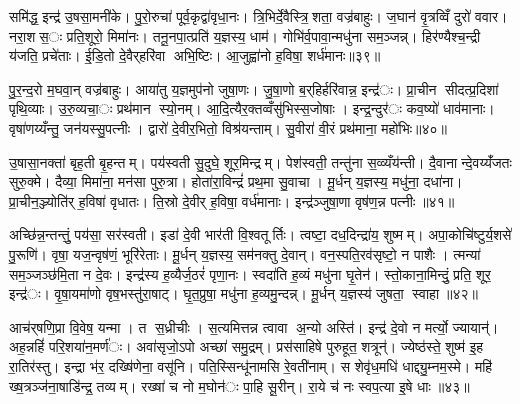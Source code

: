 
समि॑द्ध॒ इन्द्र॑ उ॒षसा॒मनी॑के। पु॒रो॒रुचा॑ पूर्व॒कृद्वा॑वृधा॒नः। त्रि॒भिर्दे॒वैस्त्रि॒शता॒ वज्र॑बाहुः। ज॒घान॑ वृ॒त्रव्विँ दुरो॑ ववार। नरा॒शस॒ः प्रति॒शूरो॒ मिमा॑नः। तनू॒नपा॒त्प्रति॑ य॒ज्ञस्य॒ धाम॑। गोभि॑र्व॒पावा॒न्मधु॑ना सम॒ञ्जन्न्। हिर॑ण्यैश्च॒न्द्री य॑जति॒ प्रचे॑ताः। ई॒डि॒तो दे॒वैर्‌हरि॑वा अभि॒ष्टिः। आ॒जुह्वा॑नो ह॒विषा॒ शर्ध॑मानः॥३९॥

पु॒र॒न्द॒रो म॒घवा॒न् वज्र॑बाहुः। आया॑तु य॒ज्ञमुप॑नो जुषा॒णः। जु॒षा॒णो ब॒र्‌हिर्हरि॑वान्न॒ इन्द्र॑ः। प्रा॒चीन सीदत्प्र॒दिशा॑ पृथि॒व्याः। उ॒रु॒व्यचा॒ः प्रथ॑मान स्यो॒नम्। आ॒दि॒त्यैर॒क्तव्वँसु॑भिस्स॒जोषाः। इन्द्र॒न्दुर॑ः कव॒ष्यो॑ धाव॑मानाः। वृषा॑णय्यँन्तु॒ जन॑यस्सु॒पत्नीः। द्वारो॑ दे॒वीर॒भितो॒ विश्र॑यन्ताम्। सु॒वीरा॑ वी॒रं प्रथ॑माना॒ महो॑भिः॥४०॥

उ॒षासा॒नक्ता॑ बृह॒ती बृ॒हन्तम्। पय॑स्वती सु॒दुघे॒ शूर॒मिन्द्रम्। पेश॑स्वती॒ तन्तु॑ना स॒व्व्यँय॑न्ती। दै॒वानान्दे॒वय्यँ॑जतः सुरु॒क्मे। दैव्या॒ मिमा॑ना॒ मन॑सा पुरु॒त्रा। होता॑रा॒विन्द्रं॑ प्रथ॒मा सु॒वाचा। मू॒र्धन् य॒ज्ञस्य॒ मधु॑ना॒ दधा॑ना। प्रा॒चीन॒ञ्ज्योति॑र् ह॒विषा॑ वृधातः। ति॒स्रो दे॒वीर्‌ ह॒विषा॒ वर्ध॑मानाः। इन्द्र॑ञ्जुषा॒णा वृष॑ण॒न्न पत्नीः॥४१॥

अच्छि॑न्न॒न्तन्तुं॒ पय॑सा॒ सर॑स्वती। इडा॑ दे॒वी भार॑ती वि॒श्वतूर्तिः। त्वष्टा॒ दध॒दिन्द्रा॑य॒ शुष्मम्। अपा॒कोचि॑ष्टुर्य॒शसे॑ पु॒रूणि॑। वृषा॒ यज॒न्वृष॑णं॒ भूरि॑रेताः। मू॒र्धन् य॒ज्ञस्य॒ सम॑नक्तु दे॒वान्। वन॒स्पति॒रव॑सृष्टो॒ न पाशैः। त्मन्या॑ सम॒ञ्जञ्छ॑मि॒ता न दे॒वः। इन्द्र॑स्य ह॒व्यैर्ज॒ठरं॑ पृणा॒नः। स्वदा॑ति ह॒व्यं मधु॑ना घृ॒तेन॑। स्तो॒काना॒मिन्दुं॒ प्रति॒ शूर॒ इन्द्र॑ः। वृ॒षा॒यमा॑णो वृष॒भस्तु॑रा॒षाट्। घृ॒त॒प्रुषा॒ मधु॑ना ह॒व्यमु॒न्दन्न्। मू॒र्धन् य॒ज्ञस्य॑ जुषता॒ स्वाहा॥४२॥


आच॑र्‌षणि॒प्रा वि॒वेष॒ यन्मा। त स॒ध्रीचीः। स॒त्यमित्तन्न त्वावा अ॒न्यो अस्ति॑। इन्द्र॑ दे॒वो न मर्त्यो॒ ज्यायान्॑। अह॒न्नहिं॑ परि॒शया॑न॒मर्ण॑ः। अवा॑सृजो॒ऽपो अच्छा॑ समु॒द्रम्। प्रस॑साहिषे पुरुहूत॒ शत्रून्॑। ज्येष्ठ॑स्ते॒ शुष्म॑ इ॒ह रा॒तिर॑स्तु। इन्द्रा भ॑र॒ दख्षि॑णेना॒ वसू॑नि। पति॒स्सिन्धू॑नामसि रे॒वती॑नाम्। स शेवृ॑ध॒मधि॑ धाद्द्यु॒म्नम॒स्मे। महि॑ ख्ष॒त्रञ्ज॑ना॒षाडि॑न्द्र॒ तव्यम्। रख्षा॑ च नो म॒घोन॑ः पा॒हि सू॒रीन्। रा॒ये च॑ नः स्वप॒त्या इ॒षे धाः॥४३॥


